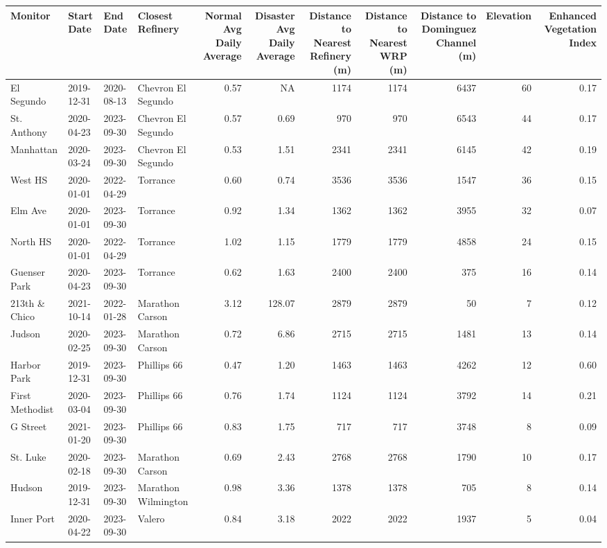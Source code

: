 
\begin{tabular}{l|l|l|l|r|r|r|r|r|r|r}
\hline
Monitor & Start Date & End Date & Closest Refinery & Normal Avg Daily Average & Disaster Avg Daily Average & Distance to Nearest Refinery (m) & Distance to Nearest WRP (m) & Distance to Dominguez Channel (m) & Elevation & Enhanced Vegetation Index\\
\hline
El Segundo & 2019-12-31 & 2020-08-13 & Chevron El Segundo & 0.57 & NA & 1174 & 1174 & 6437 & 60 & 0.17\\
\hline
St. Anthony & 2020-04-23 & 2023-09-30 & Chevron El Segundo & 0.57 & 0.69 & 970 & 970 & 6543 & 44 & 0.17\\
\hline
Manhattan & 2020-03-24 & 2023-09-30 & Chevron El Segundo & 0.53 & 1.51 & 2341 & 2341 & 6145 & 42 & 0.19\\
\hline
West HS & 2020-01-01 & 2022-04-29 & Torrance & 0.60 & 0.74 & 3536 & 3536 & 1547 & 36 & 0.15\\
\hline
Elm Ave & 2020-01-01 & 2023-09-30 & Torrance & 0.92 & 1.34 & 1362 & 1362 & 3955 & 32 & 0.07\\
\hline
North HS & 2020-01-01 & 2022-04-29 & Torrance & 1.02 & 1.15 & 1779 & 1779 & 4858 & 24 & 0.15\\
\hline
Guenser Park & 2020-04-23 & 2023-09-30 & Torrance & 0.62 & 1.63 & 2400 & 2400 & 375 & 16 & 0.14\\
\hline
213th \& Chico & 2021-10-14 & 2022-01-28 & Marathon Carson & 3.12 & 128.07 & 2879 & 2879 & 50 & 7 & 0.12\\
\hline
Judson & 2020-02-25 & 2023-09-30 & Marathon Carson & 0.72 & 6.86 & 2715 & 2715 & 1481 & 13 & 0.14\\
\hline
Harbor Park & 2019-12-31 & 2023-09-30 & Phillips 66 & 0.47 & 1.20 & 1463 & 1463 & 4262 & 12 & 0.60\\
\hline
First Methodist & 2020-03-04 & 2023-09-30 & Phillips 66 & 0.76 & 1.74 & 1124 & 1124 & 3792 & 14 & 0.21\\
\hline
G Street & 2021-01-20 & 2023-09-30 & Phillips 66 & 0.83 & 1.75 & 717 & 717 & 3748 & 8 & 0.09\\
\hline
St. Luke & 2020-02-18 & 2023-09-30 & Marathon Carson & 0.69 & 2.43 & 2768 & 2768 & 1790 & 10 & 0.17\\
\hline
Hudson & 2019-12-31 & 2023-09-30 & Marathon Wilmington & 0.98 & 3.36 & 1378 & 1378 & 705 & 8 & 0.14\\
\hline
Inner Port & 2020-04-22 & 2023-09-30 & Valero & 0.84 & 3.18 & 2022 & 2022 & 1937 & 5 & 0.04\\
\hline
\end{tabular}
